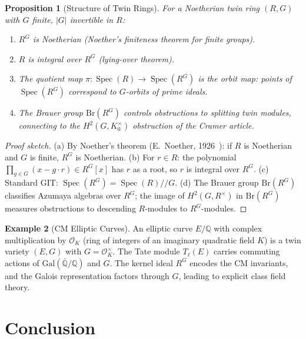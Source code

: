 \documentclass[11pt,twocolumn]{article}
\theoremstyle{plain}\newtheorem{theorem}{Theorem}\newtheorem{proposition}[theorem]{Proposition}\newtheorem{corollary}[theorem]{Corollary}\newtheorem{lemma}[theorem]{Lemma}
\theoremstyle{definition}\newtheorem{definition}[theorem]{Definition}\newtheorem{example}[theorem]{Example}
\theoremstyle{remark}\newtheorem{remark}[theorem]{Remark}
\newcommand{\Spec}{\operatorname{Spec}}
\begin{document}
\begin{proposition}[Structure of Twin Rings]\label{prop:twin-ring-structure}
For a Noetherian twin ring $(R, G)$ with $G$ finite, $|G|$ invertible in $R$:
\begin{enumerate}[label=(\alph*)]
    \item $R^G$ is Noetherian (Noether's finiteness theorem for finite groups).
    \item $R$ is integral over $R^G$ (lying-over theorem).
    \item The quotient map $\pi: \Spec(R) \to \Spec(R^G)$ is the orbit map: points of $\Spec(R^G)$ correspond to $G$-orbits of prime ideals.
    \item The Brauer group $\mathrm{Br}(R^G)$ controls obstructions to splitting twin modules, connecting to the $H^2(G, K_0^\times)$ obstruction of the Cramer article.
\end{enumerate}
\end{proposition}

\begin{proof}[Proof sketch]
(a) By Noether's theorem (E.\ Noether, 1926~\cite{noether1926}): if $R$ is Noetherian and $G$ is finite, $R^G$ is Noetherian.
(b) For $r \in R$: the polynomial $\prod_{g \in G}(x - g \cdot r) \in R^G[x]$ has $r$ as a root, so $r$ is integral over $R^G$.
(c) Standard GIT: $\Spec(R^G) = \Spec(R)/\!/G$.
(d) The Brauer group $\mathrm{Br}(R^G)$ classifies Azumaya algebras over $R^G$; the image of $H^2(G, R^\times)$ in $\mathrm{Br}(R^G)$ measures obstructions to descending $R$-modules to $R^G$-modules.
\end{proof}

\begin{example}[CM Elliptic Curves]
An elliptic curve $E/\mathbb{Q}$ with complex multiplication by $\mathcal{O}_K$ (ring of integers of an imaginary quadratic field $K$) is a twin variety $(E, G)$ with $G = \mathcal{O}_K^\times$. The Tate module $T_\ell(E)$ carries commuting actions of $\mathrm{Gal}(\bar{\mathbb{Q}}/\mathbb{Q})$ and $G$. The kernel ideal $R^G$ encodes the CM invariants, and the Galois representation factors through $G$, leading to explicit class field theory.
\end{example}


\section{Conclusion}
\label{sec:conclusion}
\end{document}
